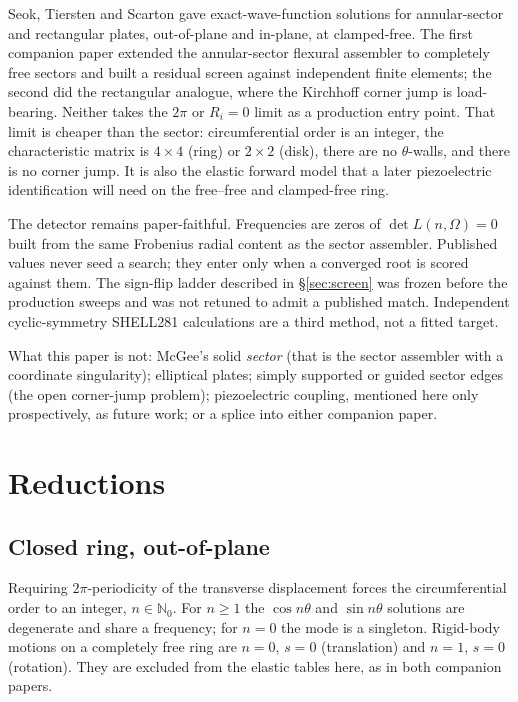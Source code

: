 \documentclass[11pt]{article}
\begin{document}
Seok, Tiersten and Scarton \cite{seok1,seok2,seok3,seok4} gave
exact-wave-function solutions for annular-sector and rectangular plates,
out-of-plane and in-plane, at clamped-free. The first companion paper
\cite{mccune2026annular} extended the annular-sector flexural assembler to
completely free sectors and built a residual screen against independent finite
elements; the second \cite{mccune2026rect} did the rectangular analogue, where
the Kirchhoff corner jump is load-bearing. Neither takes the $2\pi$ or $R_i=0$
limit as a production entry point. That limit is cheaper than the sector:
circumferential order is an integer, the characteristic matrix is $4\times4$
(ring) or $2\times2$ (disk), there are no $\theta$-walls, and there is no
corner jump. It is also the elastic forward model that a later piezoelectric
identification will need on the free--free and clamped-free ring.

The detector remains paper-faithful. Frequencies are zeros of
$\det L(n,\Omega)=0$ built from the same Frobenius radial content as the
sector assembler. Published values never seed a search; they enter only when a
converged root is scored against them. The sign-flip ladder described in
\S\ref{sec:screen} was frozen before the production sweeps and was not retuned
to admit a published match. Independent cyclic-symmetry SHELL281 calculations
\cite{ansys} are a third method, not a fitted target.

What this paper is not: McGee's solid \emph{sector} (that is the sector
assembler with a coordinate singularity); elliptical plates; simply supported
or guided sector edges (the open corner-jump problem); piezoelectric coupling,
mentioned here only prospectively, as future work; or a splice into either
companion paper.

\section{Reductions}\label{sec:reduce}

\subsection{Closed ring, out-of-plane}\label{sec:ring}
Requiring $2\pi$-periodicity of the transverse displacement forces the
circumferential order to an integer, $n\in\mathbb{N}_0$. For $n\ge1$ the
$\cos n\theta$ and $\sin n\theta$ solutions are degenerate and share a
frequency; for $n=0$ the mode is a singleton. Rigid-body motions on a
completely free ring are $n=0$, $s=0$ (translation) and $n=1$, $s=0$
(rotation). They are excluded from the elastic tables here, as in both
companion papers.
\end{document}
